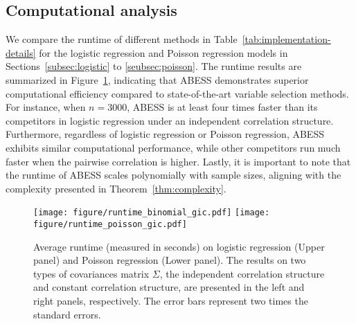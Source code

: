 \subsection{Computational analysis}

We compare the runtime of different methods in Table~\ref{tab:implementation-details} for the logistic regression and Poisson regression models in Sections~\ref{subsec:logistic} to \ref{seubsec:poisson}. The runtime results are summarized in Figure~\ref{fig:simu_runtime}, indicating that ABESS demonstrates superior computational efficiency compared to state-of-the-art variable selection methods. For instance, when $n = 3000$, ABESS is at least four times faster than its competitors in logistic regression under an independent correlation structure. Furthermore, regardless of logistic regression or Poisson regression, ABESS exhibits similar computational performance, while other competitors run much faster when the pairwise correlation is higher. Lastly, it is important to note that the runtime of ABESS scales polynomially with sample sizes, aligning with the complexity presented in Theorem~\ref{thm:complexity}.

\begin{figure}[htbp]
\centering
\texttt{[image: figure/runtime\_binomial\_gic.pdf]}
\texttt{[image: figure/runtime\_poisson\_gic.pdf]}
\informsMOR{
\vspace{-10pt}
}\fi
\caption{Average runtime (measured in seconds) on logistic regression (Upper panel) and Poisson regression (Lower panel). The results on two types of covariances matrix $\Sigma$, the independent correlation structure and constant correlation structure, are presented in the left and right panels, respectively. The error bars represent two times the standard errors.
}
\label{fig:simu_runtime}
\end{figure}


\informsMOR
{

}\fi
